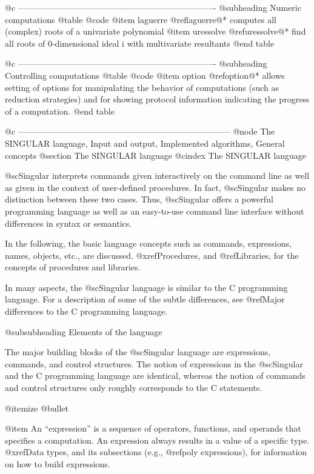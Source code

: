 @c ----------------------------------------------------------------------
@subheading Numeric computations
@table @code
@item laguerre
@ref{laguerre}@*
computes all (complex) roots of a univariate polynomial
@item uressolve
@ref{uressolve}@*
find all roots of 0-dimensional ideal i with multivariate resultants
@end table

@c ----------------------------------------------------------------------
@subheading Controlling computations
@table @code
@item option
@ref{option}@*
allows setting of options for manipulating the behavior of computations
(such as reduction strategies) and for showing protocol information indicating
the progress of a computation.
@end table

@c ---------------------------------------------------------------------------
@node The SINGULAR language, Input and output, Implemented algorithms, General concepts
@section The SINGULAR language
@cindex The SINGULAR language

@sc{Singular} interprets commands given interactively on the command
line as well as given in the context of user-defined procedures.  In
fact, @sc{Singular} makes no distinction between these two cases.
Thus, @sc{Singular} offers a powerful programming language as well as
an easy-to-use command line interface without differences in syntax or
semantics.

In the following, the basic language concepts such as commands,
expressions, names, objects, etc., are discussed.  @xref{Procedures},
and @ref{Libraries},
for the concepts of procedures
and libraries.

In many aspects, the @sc{Singular} language is similar to the C
programming language.  For a description of some of the subtle
differences, see @ref{Major differences to the C programming language}.

@subsubheading Elements of the language

The major building blocks of the @sc{Singular} language  are
expressions, commands, and control structures.  The notion of expressions
in the @sc{Singular} and the C programming language are identical,
whereas the notion of commands and control structures only roughly
corresponds to the C statements.

@itemize @bullet

@item
An ``expression'' is a sequence of operators, functions, and operands
that specifies a computation.  An expression always results in a
value of a specific type.  @xref{Data types}, and its subsections (e.g.,
@ref{poly expressions}), for information on how to build expressions.

